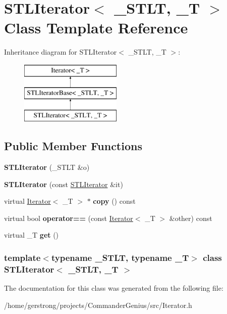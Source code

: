 \hypertarget{class_s_t_l_iterator}{
\section{STLIterator$<$ \_\-STLT, \_\-T $>$ Class Template Reference}
\label{class_s_t_l_iterator}
}
Inheritance diagram for STLIterator$<$ \_\-STLT, \_\-T $>$:\begin{figure}[H]
\begin{center}
\leavevmode
\includegraphics[height=3cm]{class_s_t_l_iterator}
\end{center}
\end{figure}
\subsection*{Public Member Functions}
\begin{DoxyCompactItemize}
\item 
\hypertarget{class_s_t_l_iterator_a4d465e5cd194344ea66728bc1cd167a3}{
{\bfseries STLIterator} (\_\-STLT \&o)}
\label{class_s_t_l_iterator_a4d465e5cd194344ea66728bc1cd167a3}

\item 
\hypertarget{class_s_t_l_iterator_a938dcc9041f531a165ca44edd001cb5e}{
{\bfseries STLIterator} (const \hyperlink{class_s_t_l_iterator}{STLIterator} \&it)}
\label{class_s_t_l_iterator_a938dcc9041f531a165ca44edd001cb5e}

\item 
\hypertarget{class_s_t_l_iterator_a3af07b86cdaf65b30d4740f4c3621574}{
virtual \hyperlink{class_iterator}{Iterator}$<$ \_\-T $>$ $\ast$ {\bfseries copy} () const }
\label{class_s_t_l_iterator_a3af07b86cdaf65b30d4740f4c3621574}

\item 
\hypertarget{class_s_t_l_iterator_af52cc3d11447b466c7a507cb0f651de4}{
virtual bool {\bfseries operator==} (const \hyperlink{class_iterator}{Iterator}$<$ \_\-T $>$ \&other) const }
\label{class_s_t_l_iterator_af52cc3d11447b466c7a507cb0f651de4}

\item 
\hypertarget{class_s_t_l_iterator_ace3361a1ec94c6d988d982f0457e2235}{
virtual \_\-T {\bfseries get} ()}
\label{class_s_t_l_iterator_ace3361a1ec94c6d988d982f0457e2235}

\end{DoxyCompactItemize}
\subsubsection*{template$<$typename \_\-STLT, typename \_\-T$>$ class STLIterator$<$ \_\-STLT, \_\-T $>$}



The documentation for this class was generated from the following file:\begin{DoxyCompactItemize}
\item 
/home/gerstrong/projects/CommanderGenius/src/Iterator.h\end{DoxyCompactItemize}
